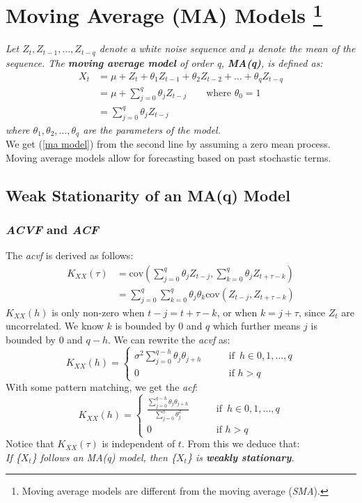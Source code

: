 \documentclass{article}
\begin{document}
\section{Moving Average (MA) Models \protect\footnote{Moving average models are different from the moving average (\emph{SMA}).}}
\textit{Let $Z_t, Z_{t-1}, \ldots, Z_{t-q}$ denote a white noise sequence and $\mu$ denote the mean of the sequence. The \textbf{moving average model} of order q, \textbf{MA(q)}, is defined as:
\begin{align}\label{ma model}
    X_t &= \mu + Z_t + \theta_1 Z_{t-1} + \theta_2 Z_{t-2} + \ldots + \theta_q Z_{t-q}\nonumber\\
    &= \mu + \sum_{j=0}^q \theta_j Z_{t-j} \qquad \text{where } \theta_0=1\nonumber\\
    &=  \sum_{j=0}^q \theta_j Z_{t-j}
\end{align}
where $\theta_1, \theta_{2}, \ldots, \theta_{q}$ are the parameters of the model.\\
}
We get (\ref{ma model}) from the second line by assuming a zero mean process. Moving average models allow for forecasting based on past stochastic terms.
\subsection{Weak Stationarity of an MA(q) Model}
\subsubsection{\emph{ACVF} and \emph{ACF}}
The \emph{acvf} is derived as follows:
\begin{align}\label{ma acvf}
    K_{XX}(\tau) &= \text{cov}(\sum_{j=0}^q \theta_j Z_{t-j}, \sum_{k=0}^q \theta_j Z_{t+\tau-k})\nonumber\\
    &= \sum_{j=0}^q \sum_{k=0}^q \theta_j \theta_k \text{cov}(Z_{t-j}, Z_{t+\tau-k})\nonumber
\end{align}
$K_{XX}(h)$ is only non-zero when $t-j=t+\tau-k$, or when $k=j+\tau$, since $Z_t$ are uncorrelated. We know $k$ is bounded by 0 and $q$ which further means $j$ is bounded by 0 and $q-h$. We can rewrite the \emph{acvf} as:
\begin{equation}\label{ma acvf final}
    K_{XX}(h)=\begin{cases}
        \sigma^2\sum_{j=0}^{q-h} \theta_j \theta_{j+h} \qquad &\text{if } \, h \in 0, 1, \ldots, q\\
        0 \qquad &\text{if } h > q
    \end{cases}
\end{equation}
With some pattern matching, we get the \emph{acf}:
\begin{equation}\label{ma acf}
    K_{XX}(h)=\begin{cases}
        \frac{\sum_{j=0}^{q-h} \theta_j \theta_{j+h}}{\sum_{j=0}^q \theta_j^2} \qquad &\text{if } \, h \in 0, 1, \ldots, q\\
        0 \qquad &\text{if } h > q
    \end{cases}
\end{equation}
Notice that $K_{XX}(\tau)$ is independent of $t$. From this we deduce that:\\
\textit{If \{$X_t$\} follows an MA(q) model, then \{$X_t$\} is \textbf{weakly stationary}.}
\end{document}
